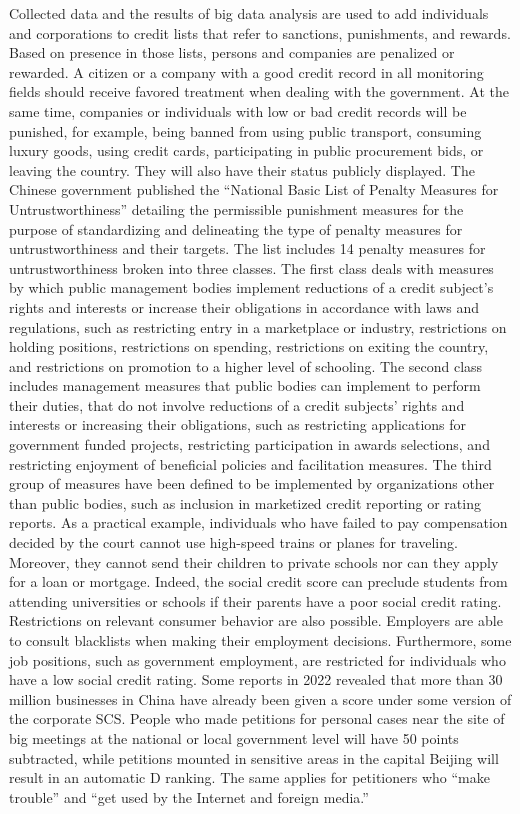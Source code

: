Collected data and the results of big data analysis are used to add individuals and corporations to credit lists that refer to sanctions, punishments, and rewards. Based on presence in those lists, persons and companies are penalized or rewarded. A citizen or a company with a good credit record in all monitoring fields should receive favored treatment when dealing with the government. At the same time, companies or individuals with low or bad credit records will be punished, for example, being banned from using public transport, consuming luxury goods, using credit cards, participating in public procurement bids, or leaving the country. They will also have their status publicly displayed. The Chinese government published the ``National Basic List of Penalty Measures for Untrustworthiness'' detailing the permissible punishment measures for the purpose of standardizing and delineating the type of penalty measures for untrustworthiness and their targets. The list includes 14 penalty measures for untrustworthiness broken into three classes. The first class deals with measures by which public management bodies implement reductions of a credit subject's rights and interests or increase their obligations in accordance with laws and regulations, such as restricting entry in a marketplace or industry, restrictions on holding positions, restrictions on spending, restrictions on exiting the country, and restrictions on promotion to a higher level of schooling. The second class includes management measures that public bodies can implement to perform their duties, that do not involve reductions of a credit subjects' rights and interests or increasing their obligations, such as restricting applications for government funded projects, restricting participation in awards selections, and restricting enjoyment of beneficial policies and facilitation measures. The third group of measures have been defined to be implemented by organizations other than public bodies, such as inclusion in marketized credit reporting or rating reports. As a practical example, individuals who have failed to pay compensation decided by the court cannot use high-speed trains or planes for traveling. Moreover, they cannot send their children to private schools nor can they apply for a loan or mortgage. Indeed, the social credit score can preclude students from attending universities or schools if their parents have a poor social credit rating. Restrictions on relevant consumer behavior are also possible. Employers are able to consult blacklists when making their employment decisions. Furthermore, some job positions, such as government employment, are restricted for individuals who have a low social credit rating. Some reports in 2022 revealed that more than 30 million businesses in China have already been given a score under some version of the corporate SCS. People who made petitions for personal cases near the site of big meetings at the national or local government level will have 50 points subtracted, while petitions mounted in sensitive areas in the capital Beijing will result in an automatic D ranking. The same applies for petitioners who ``make trouble'' and ``get used by the Internet and foreign media.''

